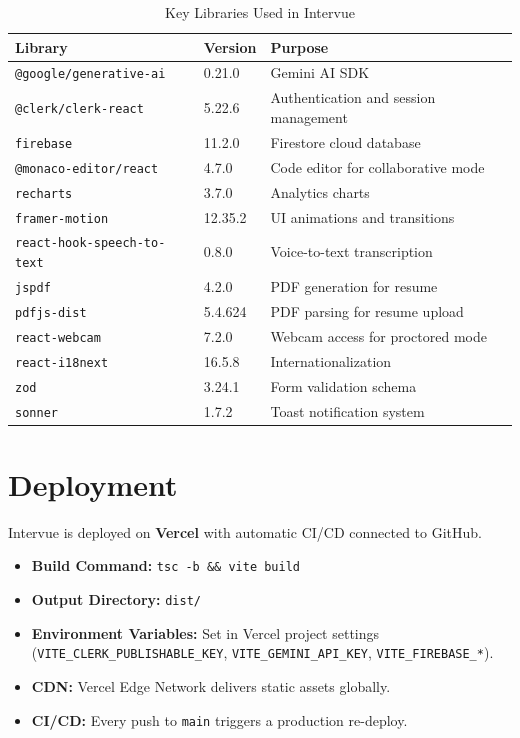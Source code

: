 \documentclass{fisatprojectfinal}
\begin{document}
\begin{table}[h!]
\centering
\caption{Key Libraries Used in Intervue}
\begin{tabular}{|p{4cm}|p{2.5cm}|p{5.5cm}|}
\hline
\textbf{Library} & \textbf{Version} & \textbf{Purpose} \\
\hline
\texttt{@google/generative-ai}   & 0.21.0  & Gemini AI SDK \\
\hline
\texttt{@clerk/clerk-react}      & 5.22.6  & Authentication and session management \\
\hline
\texttt{firebase}                & 11.2.0  & Firestore cloud database \\
\hline
\texttt{@monaco-editor/react}    & 4.7.0   & Code editor for collaborative mode \\
\hline
\texttt{recharts}                & 3.7.0   & Analytics charts \\
\hline
\texttt{framer-motion}           & 12.35.2 & UI animations and transitions \\
\hline
\texttt{react-hook-speech-to-text} & 0.8.0 & Voice-to-text transcription \\
\hline
\texttt{jspdf}                   & 4.2.0   & PDF generation for resume \\
\hline
\texttt{pdfjs-dist}              & 5.4.624 & PDF parsing for resume upload \\
\hline
\texttt{react-webcam}            & 7.2.0   & Webcam access for proctored mode \\
\hline
\texttt{react-i18next}           & 16.5.8  & Internationalization \\
\hline
\texttt{zod}                     & 3.24.1  & Form validation schema \\
\hline
\texttt{sonner}                  & 1.7.2   & Toast notification system \\
\hline
\end{tabular}
\end{table}

\section{Deployment}
Intervue is deployed on \textbf{Vercel} with automatic CI/CD connected to GitHub.
\begin{itemize}
  \item \textbf{Build Command:} \texttt{tsc -b \&\& vite build}
  \item \textbf{Output Directory:} \texttt{dist/}
  \item \textbf{Environment Variables:} Set in Vercel project settings
        (\texttt{VITE\_CLERK\_PUBLISHABLE\_KEY}, \texttt{VITE\_GEMINI\_API\_KEY},
        \texttt{VITE\_FIREBASE\_*}).
  \item \textbf{CDN:} Vercel Edge Network delivers static assets globally.
  \item \textbf{CI/CD:} Every push to \texttt{main} triggers a production re-deploy.
\end{itemize}
\end{document}
